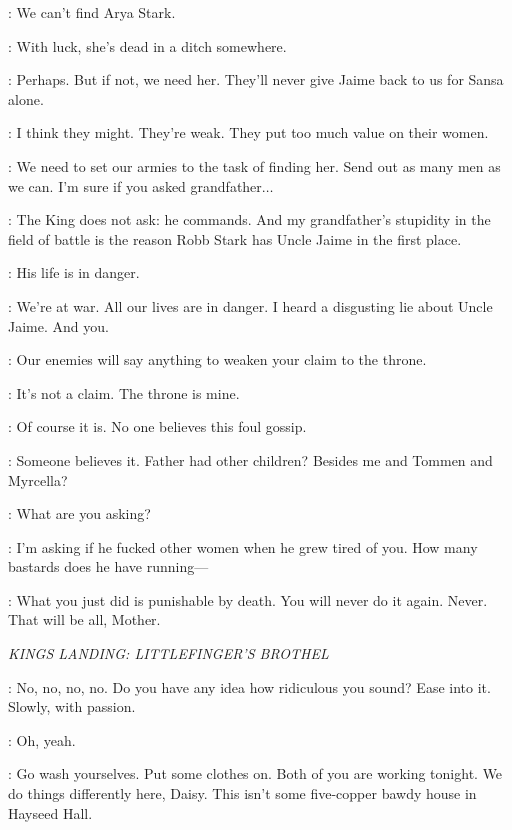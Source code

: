\CERSEI: We can't find Arya Stark.

\JOFFREY: With luck, she's dead in a ditch somewhere.

\CERSEI: Perhaps. But if not, we need her. They'll never give Jaime back to us for Sansa alone.

\JOFFREY: I think they might. They're weak. They put too much value on their women.

\CERSEI: We need to set our armies to the task of finding her. Send out as many men as we can. I'm sure if you asked grandfather$\ldots$

\JOFFREY: The King does not ask: he commands. And my grandfather's stupidity in the field of battle is the reason Robb Stark has Uncle Jaime in the first place.

\CERSEI: His life is in danger.

\JOFFREY: We're at war. All our lives are in danger. I heard a disgusting lie about Uncle Jaime. And you.

\CERSEI: Our enemies will say anything to weaken your claim to the throne.

\JOFFREY: It's not a claim. The throne is mine.

\CERSEI: Of course it is. No one believes this foul gossip.

\JOFFREY: Someone believes it. Father had other children? Besides me and Tommen and Myrcella?

\CERSEI: What are you asking?

\JOFFREY: I'm asking if he fucked other women when he grew tired of you. How many bastards does he have running---


\JOFFREY: What you just did is punishable by death. You will never do it again. Never. That will be all, Mother.


\scene

\textit{KINGS LANDING: LITTLEFINGER'S BROTHEL}


\ROS: No, no, no, no. Do you have any idea how ridiculous you sound? Ease into it. Slowly, with passion.

\DAISY:  Oh, yeah.

\ROS: Go wash yourselves. Put some clothes on. Both of you are working tonight. We do things differently here, Daisy. This isn't some five-copper bawdy house in Hayseed Hall.

